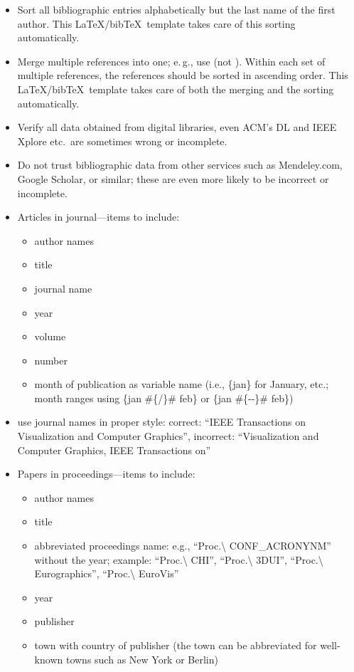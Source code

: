 \documentclass[journal]{vgtc}                %
\begin{document}
\begin{itemize}
	\item Sort all bibliographic entries alphabetically but the last name of the first author.
	This \LaTeX/bib\TeX\ template takes care of this sorting automatically.
	\item Merge multiple references into one; e.\,g., use \cite{Max:1995:OMF,Kitware:2003} (not \cite{Kitware:2003}\cite{Max:1995:OMF}).
	Within each set of multiple references, the references should be sorted in ascending order.
	This \LaTeX/bib\TeX\ template takes care of both the merging and the sorting automatically.
	\item Verify all data obtained from digital libraries, even ACM's DL and IEEE Xplore  etc.\ are sometimes wrong or incomplete.
	\item Do not trust bibliographic data from other services such as Mendeley.com, Google Scholar, or similar; these are even more likely to be incorrect or incomplete.
	\item Articles in journal---items to include:
		\begin{itemize}
		\item author names
		\item title
		\item journal name
		\item year
		\item volume
		\item number
		\item month of publication as variable name (i.e., \{jan\} for January, etc.; month ranges using \{jan \#\{/\}\# feb\} or \{jan \#\{-{}-\}\# feb\})
		\end{itemize}
	\item use journal names in proper style: correct: ``IEEE Transactions on Visualization and Computer Graphics'', incorrect: ``Visualization and Computer Graphics, IEEE Transactions on''
	\item Papers in proceedings---items to include:
		\begin{itemize}
		\item author names
		\item title
		\item abbreviated proceedings name: e.g., ``Proc.\textbackslash{} CONF\_ACRONYNM'' without the year; example: ``Proc.\textbackslash{} CHI'', ``Proc.\textbackslash{} 3DUI'', ``Proc.\textbackslash{} Eurographics'', ``Proc.\textbackslash{} EuroVis''
		\item year
		\item publisher
		\item town with country of publisher (the town can be abbreviated for well-known towns such as New York or Berlin)
		\end{itemize}
	

\end{itemize}
\end{document}
